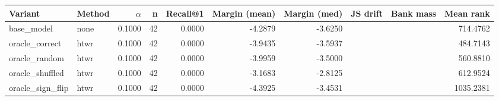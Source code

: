 \begin{tabular}{l l r r r r r r r r}
\toprule
Variant & Method & $\alpha$ & n & Recall@1 & Margin (mean) & Margin (med) & JS drift & Bank mass & Mean rank \\
\midrule
base\_model & none & 0.1000 & 42 & 0.0000 & -4.2879 & -3.6250 &  &  & 714.4762 \\
oracle\_correct & htwr & 0.1000 & 42 & 0.0000 & -3.9435 & -3.5937 &  &  & 484.7143 \\
oracle\_random & htwr & 0.1000 & 42 & 0.0000 & -3.9959 & -3.5000 &  &  & 560.8810 \\
oracle\_shuffled & htwr & 0.1000 & 42 & 0.0000 & -3.1683 & -2.8125 &  &  & 612.9524 \\
oracle\_sign\_flip & htwr & 0.1000 & 42 & 0.0000 & -4.3925 & -3.4531 &  &  & 1035.2381 \\
\bottomrule
\end{tabular}
